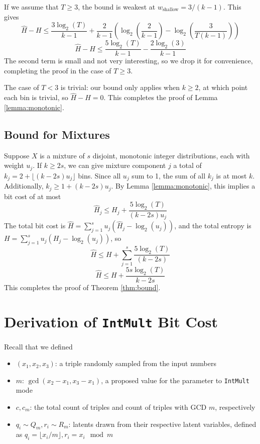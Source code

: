 \documentclass[letterpaper]{article}
\begin{document}
If we assume that $T \ge 3$, the bound is weakest at $w_\text{shallow} = 3/(k-1)$.
This gives
\[\hat{H} - H \le \frac{3\log_2(T)}{k-1} +  \frac{2}{k-1}\left(\log_2\left(\frac{2}{k-1}\right) - \log_2\left(\frac{3}{T(k-1)}\right)\right)\]
\[\hat{H} - H \le \frac{5\log_2(T)}{k-1} - \frac{2\log_2(3)}{k-1}\]
The second term is small and not very interesting, so we drop it for convenience, completing the proof in the case of $T \ge 3$.

The case of $T < 3$ is trivial: our bound only applies when $k \ge 2$, at which point each bin is trivial, so $\hat{H} - H = 0$.
This completes the proof of Lemma \ref{lemma:monotonic}.

\subsection{Bound for Mixtures}
\label{sec:mixtures}

Suppose $X$ is a mixture of $s$ disjoint, monotonic integer distributions, each with weight $u_j$.
If $k \ge 2s$, we can give mixture component $j$ a total of $k_j = 2 + \lfloor (k-2s)u_j\rfloor$ bins.
Since all $u_j$ sum to 1, the sum of all $k_j$ is at most $k$.
Additionally, $k_j \ge 1 + (k-2s)u_j$.
By Lemma \ref{lemma:monotonic}, this implies a bit cost of at most
\[\hat{H}_j \le H_j + \frac{5\log_2(T)}{(k-2s)u_j}\]
The total bit cost is $\hat{H} = \sum_{j=1}^s u_j(\hat{H}_j - \log_2(u_j))$, and the total entropy is $H = \sum_{j=1}^s u_j(H_j - \log_2(u_j))$, so
\[\hat{H} \le H + \sum_{j=1}^s \frac{5\log_2(T)}{(k-2s)}\]
\[\hat{H} \le H + \frac{5s\log_2(T)}{k-2s}\]
This completes the proof of Theorem \ref{thm:bound}.

\section{Derivation of \texttt{IntMult} Bit Cost}
\label{sec:derive_int_mult_detection}

Recall that we defined
\begin{itemize}
  \item $(x_1, x_2, x_3)$: a triple randomly sampled from the input numbers
  \item $m$: $\gcd(x_2 - x_1, x_3 - x_1)$, a proposed value for the parameter to \texttt{IntMult} mode
  \item $c, c_m$: the total count of triples and count of triples with GCD $m$, respectively
  \item $q_i \sim Q_m, r_i \sim R_m$: latents drawn from their respective latent variables, defined as $q_i = \lfloor x_i / m\rfloor, r_i = x_i \mod m$
\end{itemize}
\end{document}
